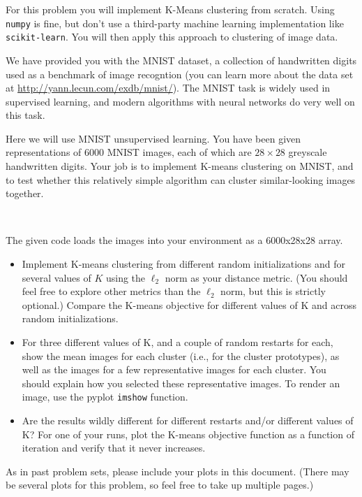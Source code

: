 \documentclass[submit]{harvardml}
\begin{document}
	For this problem you will implement  K-Means clustering from scratch. Using \texttt{numpy} is fine, but don't use a
	third-party machine learning implementation like \texttt{scikit-learn}. You will then apply this approach to clustering of image data.  
	
	
	
	We have provided you with the MNIST dataset, a collection of handwritten digits used as a benchmark of image recogntion (you  can
	learn more about the data set at  \url{http://yann.lecun.com/exdb/mnist/}). The MNIST task
	is widely used in supervised learning, and modern algorithms with neural
	networks do very well on this task. 
	
	Here we will use MNIST unsupervised learning. You have been given
	representations of 6000 MNIST images, each of which are $28\times28$
	greyscale handwritten digits. Your job is to implement K-means
	clustering on MNIST, and to test whether this relatively simple algorithm can
	cluster similar-looking images together.
	
	~
	
	\begin{problem}
		The given code loads the images into your environment as a 6000x28x28 array.
		
		\begin{itemize}
			\item Implement K-means clustering
			from different random initializations 
			and for several values of $K$ using the 
			$\ell_2$ norm as your
			distance metric. (You should feel free to explore other metrics 
			than the $\ell_2$ norm, but this is strictly optional.)  Compare the 
			K-means objective for different values of K and across random
			initializations.
			\item For three different values of K,
			and a couple of random restarts for each, 
			show the mean images for each cluster (i.e., for
			the cluster prototypes), as well as the images for a 
			few representative images for each cluster. You should explain how you selected
			these representative images. To render an image, use the pyplot \texttt{imshow} function. 
			
			\item Are the results wildly different for different
			restarts and/or different 
			values of K?
			For one of your runs, plot the K-means objective function as a function of iteration and verify that
			it never increases.
			
			
		\end{itemize}
		
		
		As in past problem sets, please include your plots in this
		document. (There may be several plots for this problem, so feel free
		to take up multiple pages.)
		
		
		
		
	\end{problem}
\end{document}

